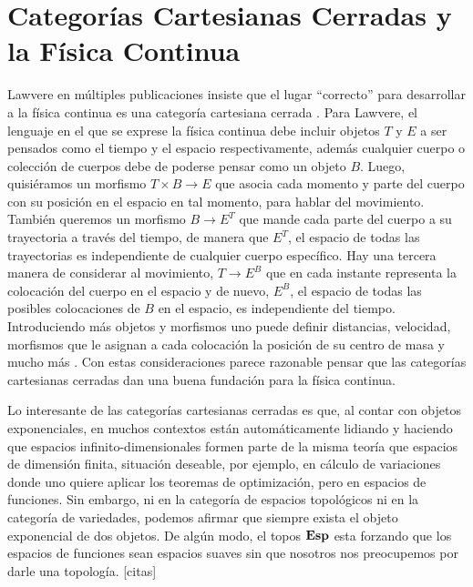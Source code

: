 \section{Categorías Cartesianas Cerradas y la Física Continua}
Lawvere en múltiples publicaciones insiste que el lugar ``correcto'' para desarrollar a
la física continua es una categoría cartesiana cerrada \cite{lawvere1979categorical} \cite{lawvere1997toposes} \cite{lawvere2006categories}. Para Lawvere,
el lenguaje en el que se exprese la física continua debe incluir objetos $T$ y $E$ a ser pensados
como el tiempo y el espacio respectivamente, además cualquier cuerpo o colección de cuerpos
debe de poderse pensar como un objeto $B$. Luego, quisiéramos un morfismo $T \times B \to E$
que asocia cada momento y parte del cuerpo con su posición en el espacio en tal momento, para
hablar del movimiento. También queremos un morfismo $B \to E^T$ que mande cada parte del
cuerpo a su trayectoria a través del tiempo, de manera que $E^T$, el espacio de todas las trayectorias
es independiente de cualquier cuerpo específico. Hay una tercera manera de considerar al movimiento,
$T \to E^B$ que en cada instante representa la colocación del cuerpo en el espacio y de nuevo,
$E^B$, el espacio de todas las posibles colocaciones de $B$ en el espacio, es independiente
del tiempo. Introduciendo más objetos y morfismos uno puede definir distancias, velocidad,
morfismos que le asignan a cada colocación la posición de su centro de masa y mucho más \cite{lawvere1980toward}.
Con estas consideraciones parece razonable pensar que las categorías cartesianas cerradas
dan una buena fundación para la física continua.

Lo interesante de las categorías cartesianas cerradas es que, al contar con objetos exponenciales,
en muchos contextos están automáticamente lidiando y haciendo que espacios infinito-dimensionales
formen parte de la misma teoría que espacios de dimensión finita, situación deseable, por
ejemplo, en cálculo de variaciones donde uno quiere aplicar los teoremas de optimización,
pero en espacios de funciones. Sin embargo, ni en la categoría de espacios topológicos ni 
en la categoría de variedades, podemos afirmar que siempre exista el objeto exponencial de
dos objetos. De algún modo, el topos $\mathbf{Esp}$ esta forzando que los espacios de funciones sean espacios suaves
sin que nosotros nos preocupemos por darle una topología. [citas]

